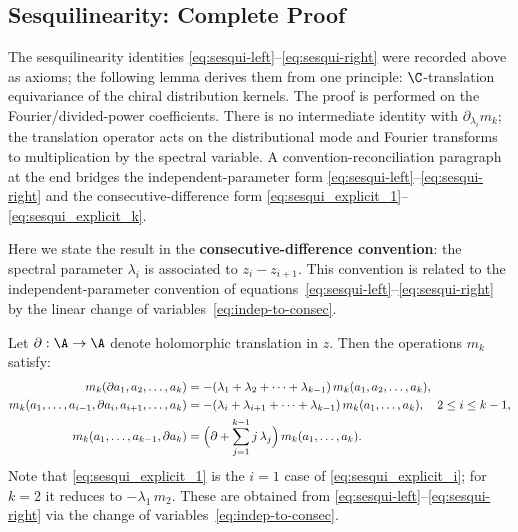 \subsection{Sesquilinearity: Complete Proof}

The sesquilinearity identities
\eqref{eq:sesqui-left}--\eqref{eq:sesqui-right} were recorded above
as axioms; the following lemma derives them from one principle:
$\C$-translation equivariance of the chiral distribution kernels.
The proof is performed on the Fourier/divided-power coefficients.
There is no intermediate identity with
\(\partial_{\lambda_i}m_k\); the translation operator acts on the
distributional mode and Fourier transforms to multiplication by the
spectral variable. A convention-reconciliation paragraph at the end
bridges the independent-parameter form
\eqref{eq:sesqui-left}--\eqref{eq:sesqui-right} and the
consecutive-difference form
\eqref{eq:sesqui_explicit_1}--\eqref{eq:sesqui_explicit_k}.

\begin{lemma}
\label{lem:sesquilinearity_explicit}
Here we state the result in the \textbf{consecutive-difference
convention}: the spectral parameter $\lambda_i$ is associated to
$z_i-z_{i+1}$.  This convention is related to the
independent-parameter convention of
equations~\eqref{eq:sesqui-left}--\eqref{eq:sesqui-right} by the
linear change of variables~\eqref{eq:indep-to-consec}.

Let $\partial : \A \to \A$ denote holomorphic translation in $z$. Then the operations $m_k$ satisfy:
\begin{align}
\label{eq:sesqui_explicit_1}
m_k(\partial a_1, a_2, \ldots, a_k)
 &= -(\lambda_1 + \lambda_2 + \cdots + \lambda_{k-1})\, m_k(a_1, a_2, \ldots, a_k),\\
\label{eq:sesqui_explicit_i}
m_k(a_1, \ldots, a_{i-1}, \partial a_i, a_{i+1}, \ldots, a_k)
 &= -(\lambda_i + \lambda_{i+1} + \cdots + \lambda_{k-1})\, m_k(a_1, \ldots, a_k),
 \quad 2\le i\le k-1,\\
\label{eq:sesqui_explicit_k}
m_k(a_1, \ldots, a_{k-1}, \partial a_k)
 &= \Bigl(\partial + \sum_{j=1}^{k-1} j\,\lambda_j\Bigr)\, m_k(a_1, \ldots, a_k).
\end{align}
Note that \eqref{eq:sesqui_explicit_1} is the $i=1$ case of \eqref{eq:sesqui_explicit_i};
for $k=2$ it reduces to $-\lambda_1\,m_2$.
These are obtained from \eqref{eq:sesqui-left}--\eqref{eq:sesqui-right}
via the change of variables~\eqref{eq:indep-to-consec}.
\end{lemma}

